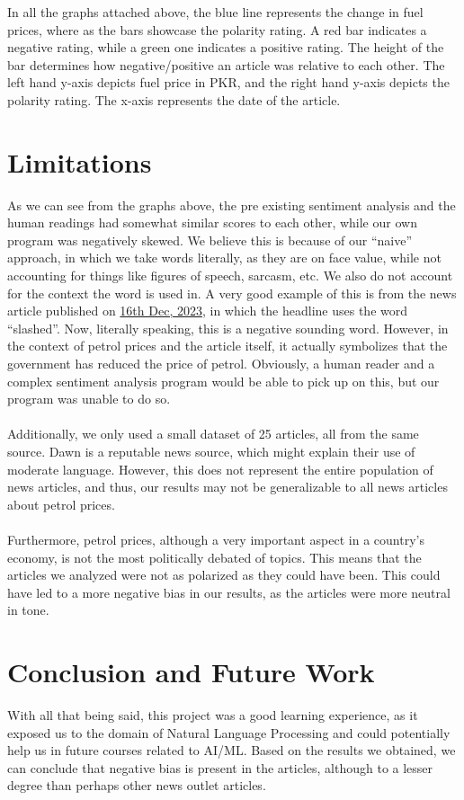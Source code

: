 \documentclass{report}
\begin{document}
In all the graphs attached above, the blue line represents the change in fuel
prices, where as the bars showcase the polarity rating. A red bar indicates a
negative rating, while a green one indicates a positive rating. The height of
the bar determines how negative/positive an article was relative to each
other. The left hand y-axis depicts fuel price in PKR, and the right hand y-axis depicts the polarity rating. The x-axis represents the date of the article.

\section{Limitations}
As we can see from the graphs above, the pre existing sentiment analysis
and the human readings had somewhat similar scores to each other, while
our own program was negatively skewed. We believe this is because of our
“naive” approach, in which we take words literally, as they are on face value,
while not accounting for things like figures of speech, sarcasm, etc. We also
do not account for the context the word is used in. A very good example of
this is from the news article published on \href{https://www.dawn.com/news/1798239/fuel-prices-slashed-by-up-to-rs14
}{16th Dec, 2023}, in which the
headline uses the word “slashed”. Now, literally speaking, this is a negative
sounding word. However, in the context of petrol prices and the article itself,
it actually symbolizes that the government has reduced the price of petrol.
Obviously, a human reader and a complex sentiment analysis program would
be able to pick up on this, but our program was unable to do so.
\\\\
Additionally, we only used a small dataset of 25 articles, all from the same source. Dawn is a reputable news source, which might explain their use of moderate language. However, this does not represent the entire population of news articles, and thus, our results may not be generalizable to all news articles about petrol prices.
\\\\
Furthermore, petrol prices, although a very important aspect in a country's economy, is not the most politically debated of topics. This means that the articles we analyzed were not as polarized as they could have been. This could have led to a more negative bias in our results, as the articles were more neutral in tone.

\section{Conclusion and Future Work}
With all that being said, this project was a good learning experience, as it
exposed us to the domain of Natural Language Processing and could
potentially help us in future courses related to AI/ML. Based on the results we obtained, we can conclude that negative bias is present in the articles, although to a lesser degree than perhaps other news outlet articles.
\end{document}
